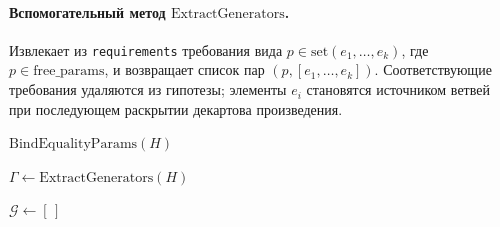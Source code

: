 \documentclass{intsys}
\begin{document}
\paragraph{Вспомогательный метод $\mathrm{ExtractGenerators}$.} Извлекает из
\texttt{requirements} требования вида
$p \in \mathrm{set}(e_1, \ldots, e_k)$, где
$p \in \mathrm{free\_params}$, и возвращает список пар
$(p, [e_1, \ldots, e_k])$. Соответствующие требования удаляются из
гипотезы; элементы $e_i$ становятся источником ветвей при последующем
раскрытии декартова произведения.

\begin{algorithm}[H]
  \caption{Конкретизация параметров гипотезы}
  \label{alg:ground}
  \footnotesize


  $\mathrm{BindEqualityParams}(H)$ \;

  $\Gamma \gets \mathrm{ExtractGenerators}(H)$ \;
  \If{$\Gamma = \varnothing$}{
    \Return{$[\,]$} \;
  }

  $\mathcal{G} \gets [\,]$ \;

   \;
\end{algorithm}
\vfill
\end{document}
